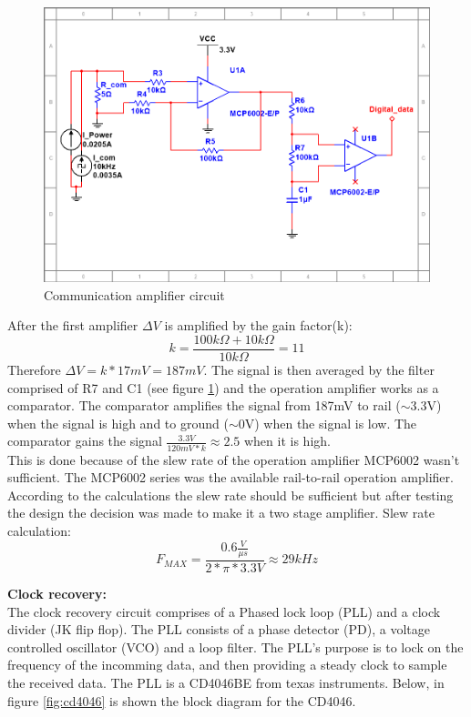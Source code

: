\begin{figure}[H]
	\centering
	\includegraphics[width=.6\textwidth]{billeder/communication_amplifier_sn}
	\caption{Communication amplifier circuit}
	\label{fig:communication_amplifier_circuit}
\end{figure}

After the first amplifier $\Delta V$ is amplified by the gain factor(k):
\begin{equation}
	k=\frac{100k\Omega+10k\Omega}{10k\Omega}=11
\end{equation}
Therefore $\Delta V=k*17mV=187mV$. The signal is then averaged by the filter comprised of R7 and C1 (see figure \ref{fig:communication_amplifier_circuit}) and the operation amplifier works as a comparator. The comparator amplifies the signal from 187mV to rail ($\sim$3.3V) when the signal is high and to ground ($\sim$0V) when the signal is low. The comparator gains the signal $\frac{3.3V}{120mV*k}\approx 2.5$ when it is high.\\
This is done because of the slew rate of the operation amplifier MCP6002 wasn't sufficient. The MCP6002 series was the available rail-to-rail operation amplifier.\\
According to the calculations the slew rate should be sufficient but after testing the design the decision was made to make it a two stage amplifier.
Slew rate calculation:
\begin{equation}
	F_{MAX}=\frac{0.6\frac{V}{\mu s}}{2*\pi*3.3V}\approx29kHz
\end{equation}

\textbf{Clock recovery:}\\
The clock recovery circuit comprises of a Phased lock loop (PLL) and a clock divider (JK flip flop). The PLL consists of a phase detector (PD), a voltage controlled oscillator (VCO) and a loop filter. The PLL's purpose is to lock on the frequency of the incomming data, and then providing a steady clock to sample the received data. The PLL is a CD4046BE from texas instruments. Below, in figure \ref{fig:cd4046} is shown the block diagram for the CD4046.

